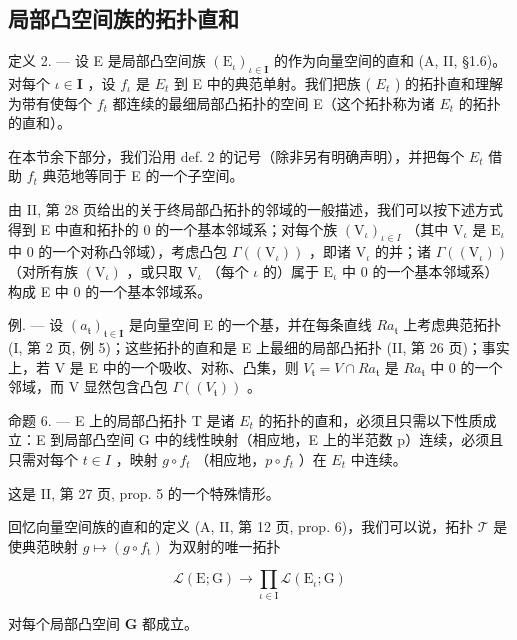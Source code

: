 \subsection{局部凸空间族的拓扑直和}

定义 2. --- 设 E 是局部凸空间族 \((\mathrm{E}_{\iota})_{\iota \in \mathbf{I}}\) 的作为向量空间的直和 (A, II, §1.6)。对每个 \(\iota \in \mathbf{I}\) ，设 \(f_{\iota}\) 是 \(E_{t}\) 到 E 中的典范单射。我们把族 ( \(E_{t}\) ) 的拓扑直和理解为带有使每个 \(f_{t}\) 都连续的最细局部凸拓扑的空间 E（这个拓扑称为诸 \(E_{t}\) 的拓扑的直和）。

在本节余下部分，我们沿用 def. 2 的记号（除非另有明确声明），并把每个 \(E_{t}\) 借助 \(f_{t}\) 典范地等同于 E 的一个子空间。

由 II, 第 28 页给出的关于终局部凸拓扑的邻域的一般描述，我们可以按下述方式得到 E 中直和拓扑的 0 的一个基本邻域系；对每个族 \((\mathrm{V}_{\iota})_{\iota \in I}\) （其中 \(\mathrm{V}_{\iota}\) 是 \(\mathrm{E}_{\iota}\) 中 0 的一个对称凸邻域），考虑凸包 \(\Gamma((\mathrm{V}_{\iota}))\) ，即诸 \(\mathrm{V}_{\iota}\) 的并；诸 \(\Gamma((\mathrm{V}_{\iota}))\) （对所有族 \((\mathrm{V}_{\iota})\) ，或只取 \(\mathrm{V}_{\iota}\) （每个 \(\iota\) 的）属于 \(\mathrm{E}_{\iota}\) 中 0 的一个基本邻域系）构成 E 中 0 的一个基本邻域系。

例. --- 设 \((a_{\mathfrak{t}})_{\mathfrak{t}\in\mathbf{I}}\) 是向量空间 E 的一个基，并在每条直线 \(Ra_{\mathfrak{t}}\) 上考虑典范拓扑 (I, 第 2 页, 例 5)；这些拓扑的直和是 E 上最细的局部凸拓扑 (II, 第 26 页)；事实上，若 V 是 E 中的一个吸收、对称、凸集，则 \(V_{\mathfrak{t}} = V \cap Ra_{\mathfrak{t}}\) 是 \(Ra_{\mathfrak{t}}\) 中 0 的一个邻域，而 V 显然包含凸包 \(\Gamma((V_{\mathfrak{t}}))\) 。

命题 6. --- E 上的局部凸拓扑 T 是诸 \(E_{t}\) 的拓扑的直和，必须且只需以下性质成立：E 到局部凸空间 G 中的线性映射（相应地，E 上的半范数 p）连续，必须且只需对每个 \(t \in I\) ，映射 \(g \circ f_{t}\) （相应地，\(p \circ f_{t}\) ）在 \(E_{t}\) 中连续。

这是 II, 第 27 页, prop. 5 的一个特殊情形。

回忆向量空间族的直和的定义 (A, II, 第 12 页, prop. 6)，我们可以说，拓扑 \(\mathcal{T}\) 是使典范映射 \(g \mapsto (g \circ f_{\mathrm{t}})\) 为双射的唯一拓扑

\[
\mathcal {L} (\mathrm{E}; \mathrm{G}) \rightarrow \prod_ {\iota \in \mathrm{I}} \mathcal {L} (\mathrm{E} _ {\iota}; \mathrm{G})\tag{1}
\]

对每个局部凸空间 \(\mathbf{G}\) 都成立。

